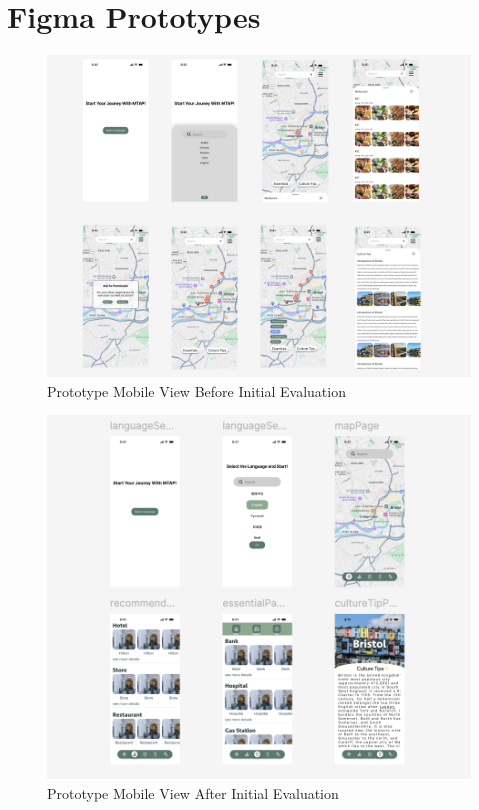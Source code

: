\section{Figma Prototypes}

\begin{figure}[H]
    \centering
    \includegraphics[height=0.3\textheight, keepaspectratio]{images/prototype/mobilePrototypeVersion1.png}
    \caption{Prototype Mobile View Before Initial Evaluation}
    \label{fig:appendix-prototype-mobile1} 
\end{figure}

\begin{figure}[H]
    \centering
    \includegraphics[height=0.3\textheight, keepaspectratio]{images/prototype/mobilePrototypeVersion2.png}
    \caption{Prototype Mobile View After Initial Evaluation}
    \label{fig:appendix-prototype-mobile2} 
\end{figure}

